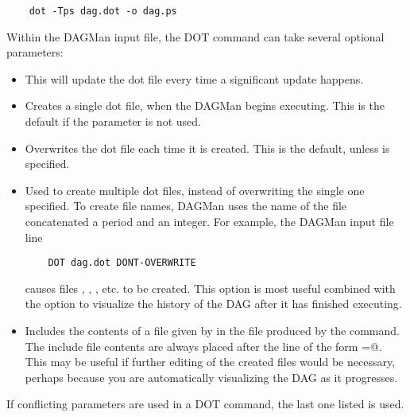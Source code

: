 \begin{verbatim}
    dot -Tps dag.dot -o dag.ps
\end{verbatim}

Within the DAGMan input file,
the DOT command can take several optional parameters:

\begin{itemize}

\item {}  This will update the dot file every time a
significant update happens. 

\item {} Creates a single dot file, when
the DAGMan begins executing. This is the default if the parameter
 is not used.

\item {} Overwrites the dot file each time it
is created. This is the default, unless 
is specified.

\item {} Used to create multiple dot files, instead
of overwriting the single one specified.
To create file names,
DAGMan uses the name of the file concatenated a period and an
integer. For example, the DAGMan input file line
\begin{verbatim}
	DOT dag.dot DONT-OVERWRITE
\end{verbatim}
causes files
,
,
,
etc. to be created.
This option is
most useful combined with the  option to
visualize the history of the DAG after it has finished executing. 

\item {} Includes the contents
of a file given by  in the file produced by the
 command.
The include file contents are always placed after the line of
the form
\verb@label=@.
This may be useful if further editing of the created files would
be necessary,
perhaps because you are automatically visualizing the DAG as it
progresses. 

\end{itemize}

If conflicting parameters are used in a DOT command, the last one
listed is used.
